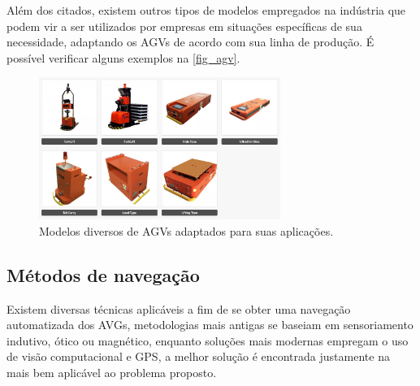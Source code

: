 Além dos citados, existem outros tipos de modelos empregados na indústria que
podem vir a ser utilizados por empresas em situações específicas de sua
necessidade, adaptando os AGVs de acordo com sua linha de produção. É possível
verificar alguns exemplos na \autoref{fig_agv}.

\begin{figure}[htb]
        \centering
        \caption{\label{fig_agv}Modelos diversos de AGVs adaptados para suas aplica{\c c}{\~o}es.}
        \includegraphics[width=0.7\textwidth]{images/suzhou-agv-robot-products.jpg}
\end{figure}


\subsection{M{\'e}todos de navega{\c c}{\~a}o}

Existem diversas técnicas aplicáveis a fim de se obter uma navegação
automatizada dos AVGs, metodologias mais antigas se baseiam em sensoriamento
indutivo, ótico ou magnético, enquanto soluções mais modernas empregam o uso de visão
computacional e GPS, a melhor solução é encontrada justamente na mais bem
aplicável ao problema proposto.

